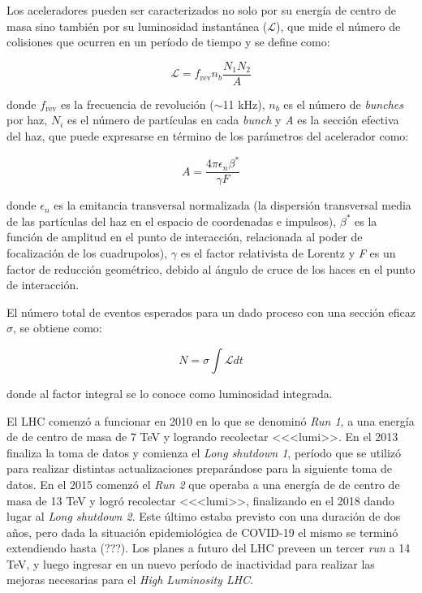 Los aceleradores pueden ser caracterizados no solo por su energía de centro de masa sino también por su luminosidad instantánea ($\mathcal{L}$), que mide el número de colisiones que ocurren en un período de tiempo y se define como: 

\begin{equation}
\mathcal{L}=f_{\text{rev}}n_{b}\frac{N_{1}N_{2}}{A}
\end{equation}

\noindent
donde $f_{\text{rev}}$ es la frecuencia de revolución ($\sim$11 kHz), $n_{b}$ es el número de \textit{bunches} por haz, $N_{i}$ es el número de partículas en cada \textit{bunch} y \textit{A} es la sección efectiva del haz, que puede expresarse en término de los parámetros del acelerador como:

\begin{equation}
A=\frac{4 \pi \epsilon_{n}\beta^{*}}{\gamma F}
\end{equation} 

\noindent
donde $\epsilon_{n}$ es la emitancia transversal normalizada (la dispersión transversal media de las partículas del  haz en el espacio de coordenadas e impulsos), $\beta^{*}$ es la función de amplitud en el punto de interacción, relacionada al poder de focalización de los cuadrupolos), $\gamma$ es el factor relativista de Lorentz y \textit{F} es un factor de reducción geométrico, debido al ángulo de cruce de los haces en el punto de interacción.

El número total de eventos esperados para un dado proceso con una sección eficaz $\sigma$, se obtiene como:

\begin{equation}
N=\sigma \int \mathcal{L} dt
\end{equation}	

\noindent
donde al factor integral se lo conoce como luminosidad integrada.

El LHC comenzó a funcionar en 2010 en lo que se denominó \textit{Run 1}, a una energía de de centro de masa de 7 TeV y logrando recolectar <<<lumi>>. En el 2013 finaliza la toma de datos y comienza el \textit{Long shutdown 1}, período que se utilizó para realizar distintas actualizaciones preparándose para la siguiente toma de datos. En el 2015 comenzó el \textit{Run 2} que operaba a una energía de de centro de masa de 13 TeV y logró recolectar <<<lumi>>, finalizando en el 2018 dando lugar al \textit{Long shutdown 2}. Este último estaba previsto con una duración de dos años, pero dada la situación epidemiológica de COVID-19 el mismo se terminó extendiendo hasta (???). Los planes a futuro del LHC preveen un tercer \textit{run} a 14 TeV, y luego ingresar en un nuevo período de inactividad para realizar las mejoras necesarias para el \textit{High Luminosity LHC}.





